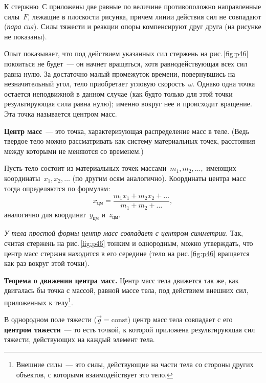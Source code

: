 \documentclass[main.tex]{subfiles}
\begin{document}
К стержню~С приложены две равные по величине противоположно направленные силы~$F$, лежащие в плоскости рисунка, причем линии действия сил не совпадают (\emph{пара сил}). Силы тяжести и реакции опоры компенсируют друг друга (на рисунке не показаны). 

Опыт показывает, что под действием указанных сил стержень на рис.\,\ref{fig:p46} покоиться не будет~--- он начнет вращаться, хотя равнодействующая всех сил равна нулю. За достаточно малый промежуток времени, повернувшись на незначительный угол, тело приобретает угловую скорость~$\omega$. Однако одна точка остается неподвижной в данном случае (как будто только для этой точки результирующая сила равна нулю); именно вокруг нее и происходит вращение. Эта точка называется центром масс.

\textbf{Центр масс}~--- это точка, характеризующая распределение масс в теле. (Ведь твердое тело можно рассматривать как систему материальных точек, расстояния между которыми не меняются со временем.)

Пусть тело состоит из материальных точек массами~$m_1,m_2,\ldots,$ имеющих координаты~$x_1,x_2,\ldots$ (по другим осям аналогично). Координаты центра масс тогда определяются по формулам:
\begin{equation}
    x_\text{цм}=\frac{m_1x_1+m_2x_2+\ldots}{m_1+m_2+\ldots},
\end{equation}
аналогично для координат~$y_\text{цм}$ и~$z_\text{цм}$. 

\emph{У тела простой формы центр масс
совпадает с центром симметрии}. Так, считая стержень на рис.\,\ref{fig:p46} тонким и однородным, можно утверждать, что центр масс стержня находится в его середине (тело на рис.\,\ref{fig:p46} вращается как раз вокруг этой точки).

\begin{law}
\textbf{Теорема о движении центра масс.} Центр масс тела движется так же, как двигалась бы точка с массой, равной массе тела, под действием внешних сил, приложенных к телу\footnote{Внешние силы~--- это силы, действующие на части тела со стороны других объектов, с которыми взаимодействует это тело.}.
\end{law}

В однородном поле тяжести ($\vec g = \mathrm{const}$)
центр масс тела совпадает с его \textbf{центром тяжести}~--- то есть точкой, к которой приложена результирующая сил тяжести, действующих на каждый элемент тела. 




















 
\end{document}
